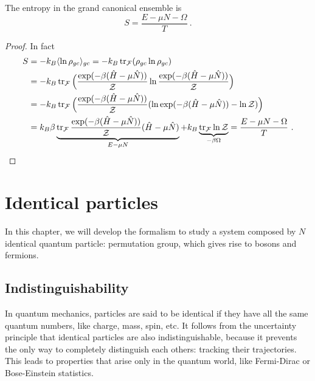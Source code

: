     The entropy in the grand canonical ensemble is 
    \begin{equation*}
        S = \frac{E - \mu N - \Omega}{T} ~.
    \end{equation*}
    \begin{proof}
        In fact 
        \begin{equation*}
        \begin{aligned}
            S & = - k_B \langle\ln \rho_{gc}\rangle_{gc} = - k_B \operatorname{tr}_{\mathcal F} ( \rho_{gc} \ln \rho_{gc}) \\ & = - k_B \operatorname{tr}_{\mathcal F} \Big ( \frac{\exp(- \beta (\hat H - \mu \hat N))}{\mathcal Z} \ln \frac{\exp(- \beta (\hat H - \mu \hat N))}{\mathcal Z} \Big) \\ & = - k_B \operatorname{tr}_{\mathcal F} \Big ( \frac{\exp(- \beta (\hat H - \mu \hat N))}{\mathcal Z} (\ln \exp(- \beta (\hat H - \mu \hat N)) - \ln \mathcal Z) \Big) \\ & = k_B \beta \underbrace{\operatorname{tr}_{\mathcal F} \frac{\exp(- \beta (\hat H - \mu \hat N))}{\mathcal Z} (\hat H - \mu \hat N)}_{E - \mu N} + k_B \underbrace{\operatorname{tr}_{\mathcal F} \ln \mathcal Z }_{- \beta \Omega} = \frac{E - \mu N - \Omega}{T} ~.
        \end{aligned}
        \end{equation*}
    \end{proof}

\chapter{Identical particles}

    In this chapter, we will develop the formalism to study a system composed by $N$ identical quantum particle: permutation group, which gives rise to bosons and fermions.

\section{Indistinguishability}

    In quantum mechanics, particles are said to be identical if they have all the same quantum numbers, like charge, mass, spin, etc. It follows from the uncertainty principle that identical particles are also indistinguishable, because it prevents the only way to completely distinguish each others: tracking their trajectories. This leads to properties that arise only in the quantum world, like Fermi-Dirac or Bose-Einstein statistics.

